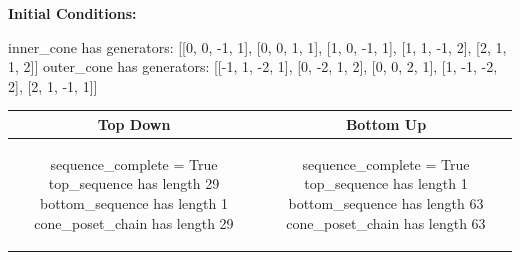 \documentclass[10pt]{article}
\begin{document}
\textbf{Initial Conditions:}
\begin{SAGE}
inner_cone has generators: 
[[0, 0, -1, 1], [0, 0, 1, 1], [1, 0, -1, 1], [1, 1, -1, 2], [2, 1, 1, 2]]
outer_cone has generators: 
[[-1, 1, -2, 1], [0, -2, 1, 2], [0, 0, 2, 1], [1, -1, -2, 2], [2, 1, -1, 1]]

\end{SAGE}
\begin{tabular}{c|c}
\textbf{Top Down} & \textbf{Bottom Up} \\ \hline  
\begin{SAGE}
sequence_complete = True
top_sequence has length 29
bottom_sequence has length 1
cone_poset_chain has length 29
\end{SAGE} 
&
\begin{SAGE}
sequence_complete = True
top_sequence has length 1
bottom_sequence has length 63
cone_poset_chain has length 63
\end{SAGE} 
\\ \hline


\end{tabular}
\end{document}

